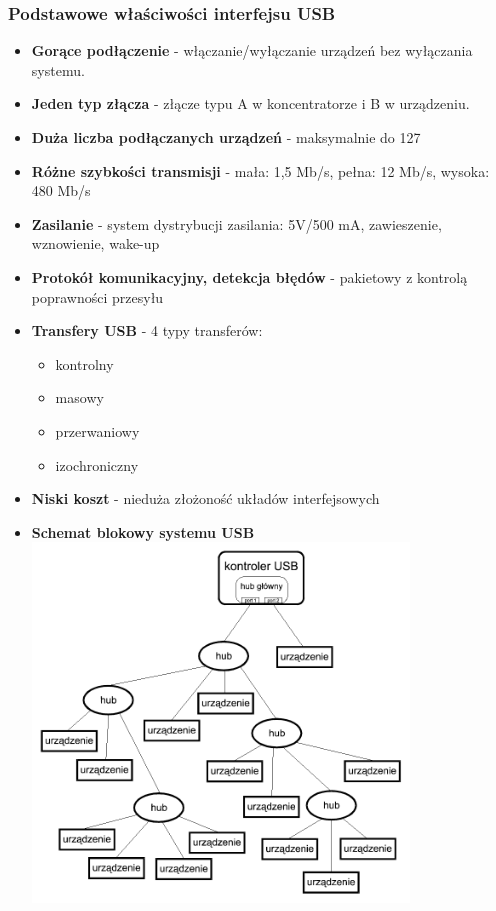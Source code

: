 		\subsubsection{Podstawowe właściwości interfejsu USB}
		\begin{itemize}
			\item \textbf{Gorące podłączenie} - włączanie/wyłączanie urządzeń bez wyłączania systemu.
			\item \textbf{Jeden typ złącza} - złącze typu A w koncentratorze i B w urządzeniu.
			\item \textbf{Duża liczba podłączanych urządzeń} - maksymalnie do 127
			\item \textbf{Różne szybkości transmisji} - mała: 1,5 Mb/s, pełna: 12 Mb/s, wysoka: 480 Mb/s
			\item \textbf{Zasilanie} - system dystrybucji zasilania: 5V/500 mA, zawieszenie, wznowienie, wake-up
			\item \textbf{Protokół komunikacyjny, detekcja błędów} - pakietowy z kontrolą poprawności przesyłu
			\item \textbf{Transfery USB} - 4 typy transferów:
				\begin{itemize}
					\item kontrolny
					\item masowy
					\item przerwaniowy
					\item izochroniczny
				\end{itemize}
			\item \textbf{Niski koszt} - nieduża złożoność układów interfejsowych
			\item \textbf{Schemat blokowy systemu USB}\\
			\includegraphics[width=10cm]{./wyklady/USB_6_1.pdf}
		\end{itemize}
